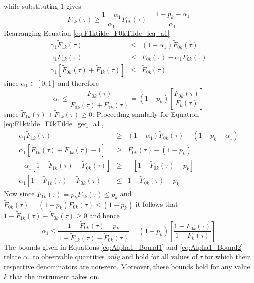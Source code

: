 \documentclass[12pt]{article}
\begin{document}
while substituting $1$ gives
\begin{equation}
  \widetilde{F}_{1k}(\tau) \geq \frac{1 - \alpha_1}{\alpha_1}\widetilde{F}_{0k}(\tau) - \frac{1 - p_k - \alpha_1}{\alpha_1}
  \label{eq:F1ktilde_F0kTilde_geq_a1}
\end{equation}
Rearranging Equation \ref{eq:F1ktilde_F0kTilde_leq_a1}
\begin{eqnarray*}
 \alpha_1 \widetilde{F}_{1k}(\tau) &\leq& (1 - \alpha_1)\widetilde{F}_{0k}(\tau)\\
 \alpha_1 \widetilde{F}_{1k}(\tau) &\leq& \widetilde{F}_{0k}(\tau) - \alpha_1 \widetilde{F}_{0k}(\tau)\\
 \alpha_1 \left[\widetilde{F}_{0k}(\tau) + \widetilde{F}_{1k}(\tau)\right]&\leq& \widetilde{F}_{0k}(\tau) 
\end{eqnarray*}
since $\alpha_1 \in [0,1]$ and therefore
\begin{equation}
  \alpha_1  \leq \frac{\widetilde{F}_{0k}(\tau)}{\widetilde{F}_{0k}(\tau) + \widetilde{F}_{1k}(\tau)} = (1 - p_k) \left[\frac{F_{0k}(\tau)}{F_k(\tau)}\right]
  \label{eq:Alpha1_Bound1}
\end{equation}
since $\widetilde{F}_{1k}(\tau) + \widetilde{F}_{1k}(\tau) \geq 0$.
Proceeding similarly for Equation \ref{eq:F1ktilde_F0kTilde_geq_a1},
\begin{eqnarray*}
  \alpha_1 \widetilde{F}_{1k}(\tau) &\geq& (1 - \alpha_1)\widetilde{F}_{0k}(\tau) - (1 - p_k - \alpha_1)\\
  \alpha_1 \left[\widetilde{F}_{1k}(\tau) + \widetilde{F}_{0k}(\tau) - 1\right] &\geq& \widetilde{F}_{0k}(\tau) - (1 - p_k)\\
  -\alpha_1 \left[ 1 - \widetilde{F}_{1k}(\tau) - \widetilde{F}_{0k}(\tau) \right] &\geq& -\left[1 - \widetilde{F}_{0k}(\tau) - p_k \right]\\
  \alpha_1 \left[ 1 - \widetilde{F}_{1k}(\tau) - \widetilde{F}_{0k}(\tau) \right] &\leq& 1 - \widetilde{F}_{0k}(\tau) - p_k 
\end{eqnarray*}
Now since $\widetilde{F}_{1k}(\tau) = p_k F_{1k}(\tau) \leq p_k$ and $\widetilde{F}_{0k}(\tau) = (1 - p_k) F_{0k}(\tau) \leq (1 - p_k)$ it follows that $1 - \widetilde{F}_{1k}(\tau) - \widetilde{F}_{0k}(\tau) \geq 0$ and hence
\begin{equation}
  \alpha_1 \leq \frac{1 - \widetilde{F}_{0k}(\tau) - p_k}{1 - \widetilde{F}_{1k}(\tau) - \widetilde{F}_{0k}(\tau)} = (1 - p_k) \left[\frac{1 - F_{0k}(\tau)}{1 - F_k(\tau)}\right]
  \label{eq:Alpha1_Bound2}
\end{equation}
The bounds given in Equations \ref{eq:Alpha1_Bound1} and \ref{eq:Alpha1_Bound2} relate $\alpha_1$ to observable quantities \emph{only} and hold for all values of $\tau$ for which their respective denominators are non-zero.
Moreover, these bounds hold for any value $k$ that the instrument takes on.
\end{document}
